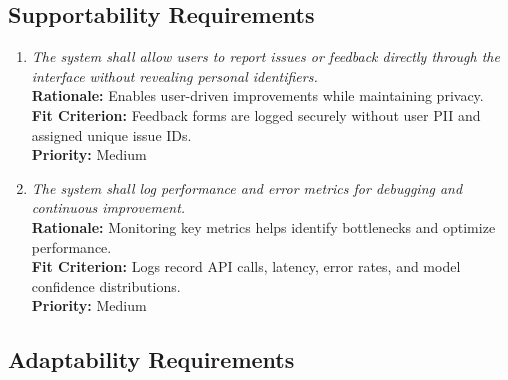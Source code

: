 \documentclass[12pt]{article}
\begin{document}
\subsection{Supportability Requirements}

\begin{enumerate}[label=MS-SUP\arabic*., wide=0pt, leftmargin=*]
  \item \emph{The system shall allow users to report issues or feedback directly through the interface without revealing personal identifiers.}\\[2mm]
    {\bf Rationale:} Enables user-driven improvements while maintaining privacy.\\
    {\bf Fit Criterion:} Feedback forms are logged securely without user PII and assigned unique issue IDs.\\
    {\bf Priority:} Medium

  \item \emph{The system shall log performance and error metrics for debugging and continuous improvement.}\\[2mm]
    {\bf Rationale:} Monitoring key metrics helps identify bottlenecks and optimize performance.\\
    {\bf Fit Criterion:} Logs record API calls, latency, error rates, and model confidence distributions.\\
    {\bf Priority:} Medium
\end{enumerate}

\subsection{Adaptability Requirements}
\end{document}
